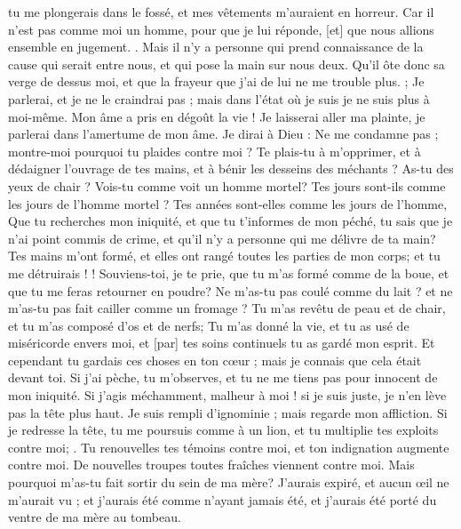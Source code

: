 \begin{multicols}{2}
tu me plongerais dans le fossé, et mes vêtements m'auraient en horreur.
Car il n'est pas comme moi un homme, pour que je lui réponde, [et] que nous allions ensemble en jugement. .
Mais il n'y a personne qui prend connaissance de la cause qui serait entre nous, et qui pose la main sur nous deux. 
Qu'il ôte donc sa verge de dessus moi, et que la frayeur que j'ai de lui ne me trouble plus. ;
Je parlerai, et je ne le craindrai pas ; mais dans l'état où je suis je ne suis plus à moi-même. 
\VerseOne{}Mon âme a pris en dégoût la vie ! Je laisserai aller ma plainte, je parlerai dans l'amertume de mon âme.
Je dirai à Dieu : Ne me condamne pas ; montre-moi pourquoi tu plaides contre moi ?
Te plais-tu à m'opprimer, et à dédaigner l'ouvrage de tes mains, et à bénir les desseins des méchants ?
As-tu des yeux de chair ? Vois-tu comme voit un homme mortel?
Tes jours sont-ils comme les jours de l'homme mortel ? Tes années sont-elles comme les jours de l'homme, 
Que tu recherches mon iniquité, et que tu t'informes de mon péché,
tu sais que je n'ai point commis de crime, et qu'il n'y a personne qui me délivre de ta main?
Tes mains m'ont formé, et elles ont rangé toutes les parties de mon corps; et tu me détruirais ! !
Souviens-toi, je te prie, que tu m'as formé comme de la boue, et que tu me feras retourner en poudre?
Ne m'as-tu pas coulé comme du lait ? et ne m'as-tu pas fait cailler comme un fromage ?
Tu m'as revêtu de peau et de chair, et tu m'as composé d'os et de nerfs;
Tu m'as donné la vie, et tu as usé de miséricorde envers moi, et [par] tes soins continuels tu as gardé mon esprit.
Et cependant tu gardais ces choses en ton cœur ; mais je connais que cela était devant toi. 
Si j'ai pèche, tu m'observes, et tu ne me tiens pas pour innocent de mon iniquité.
Si j'agis méchamment, malheur à moi ! si je suis juste, je n'en lève pas la tête plus haut. Je suis rempli d'ignominie ; mais regarde mon affliction. 
Si je redresse la tête, tu me poursuis comme à un lion, et tu multiplie tes exploits contre moi; .
Tu renouvelles tes témoins contre moi, et ton indignation augmente contre moi. De nouvelles troupes toutes fraîches viennent contre moi.
Mais pourquoi m'as-tu fait sortir du sein de ma mère? J'aurais expiré, et aucun œil ne m'aurait vu ;
et j'aurais été comme n'ayant jamais été, et j'aurais été porté du ventre de ma mère au tombeau.

\end{multicols}
